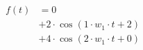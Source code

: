 \begin{center}
\begin{align*}
f(t)
&= 0 \\
&+ 2 \cdot \cos( 1 \cdot w_1 \cdot t + 2) \\
&+ 4 \cdot \cos( 2 \cdot w_1 \cdot t + 0)
\end{align*}
\end{center}
